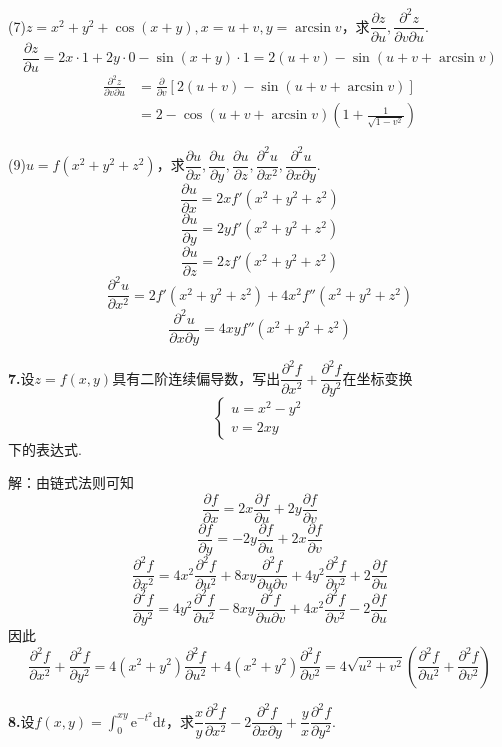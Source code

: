 \documentclass[12pt, a4paper]{article}
\newcommand{\e}{\mathrm{e}}
\newcommand{\dif}{\mathrm{d}}
\begin{document}
(7)\(z = x^2 + y^2 + \cos(x + y), x = u + v, y = \arcsin v\)，求\(\dfrac{\partial z}{\partial u}, \dfrac{\partial^2 z}{\partial v \partial u}\).
\[\frac{\partial z}{\partial u} = 2x \cdot 1 + 2y \cdot 0 - \sin(x + y) \cdot 1 = 2(u + v) - \sin(u + v + \arcsin v)\]
\begin{align*}
\frac{\partial^2 z}{\partial v \partial u} &= \frac{\partial}{\partial v}\left[2(u + v) - \sin(u + v + \arcsin v)\right] \\
&= 2 - \cos(u + v + \arcsin v) \left(1 + \frac{1}{\sqrt{1 - v^2}}\right)
\end{align*}

(9)\(u = f(x^2 + y^2 + z^2)\)，求\(\dfrac{\partial u}{\partial x}, \dfrac{\partial u}{\partial y}, \dfrac{\partial u}{\partial z}, \dfrac{\partial^2 u}{\partial x^2}, \dfrac{\partial^2 u}{\partial x \partial y}\).
\[\frac{\partial u}{\partial x} = 2x f'(x^2 + y^2 + z^2)\]
\[\frac{\partial u}{\partial y} = 2y f'(x^2 + y^2 + z^2)\]
\[\frac{\partial u}{\partial z} = 2z f'(x^2 + y^2 + z^2)\]
\[\frac{\partial^2 u}{\partial x^2} = 2f'(x^2 + y^2 + z^2) + 4x^2 f''(x^2 + y^2 + z^2)\]
\[\frac{\partial^2 u}{\partial x \partial y} = 4xy f''(x^2 + y^2 + z^2)\]

\textbf{7.}设\(z = f(x, y)\)具有二阶连续偏导数，写出\(\dfrac{\partial^2 f}{\partial x^2} + \dfrac{\partial^2 f}{\partial y^2}\)在坐标变换
\[\begin{cases}
u = x^2 - y^2 \\
v = 2xy
\end{cases}\]
下的表达式.

解：由链式法则可知
\[\frac{\partial f}{\partial x} = 2x\frac{\partial f}{\partial u} + 2y\frac{\partial f}{\partial v}\]
\[\frac{\partial f}{\partial y} = -2y\frac{\partial f}{\partial u} + 2x\frac{\partial f}{\partial v}\]
\[\frac{\partial^2 f}{\partial x^2} = 4x^2 \frac{\partial^2 f}{\partial u^2} + 8xy \frac{\partial^2 f}{\partial u \partial v} + 4y^2 \frac{\partial^2 f}{\partial v^2} + 2\frac{\partial f}{\partial u}\]
\[\frac{\partial^2 f}{\partial y^2} = 4y^2 \frac{\partial^2 f}{\partial u^2} - 8xy \frac{\partial^2 f}{\partial u \partial v} + 4x^2 \frac{\partial^2 f}{\partial v^2} - 2\frac{\partial f}{\partial u}\]
因此
\[\frac{\partial^2 f}{\partial x^2} + \frac{\partial^2 f}{\partial y^2} = 4(x^2 + y^2) \frac{\partial^2 f}{\partial u^2} + 4(x^2 + y^2) \frac{\partial^2 f}{\partial v^2} = 4\sqrt{u^2 + v^2}(\frac{\partial^2 f}{\partial u^2} + \frac{\partial^2 f}{\partial v^2})\]

\textbf{8.}设\(f(x, y) = \int_{0}^{xy} \e^{-t^2} \dif t\)，求\(\dfrac{x}{y} \dfrac{\partial^2 f}{\partial x^2} - 2\dfrac{\partial^2 f}{\partial x \partial y} + \dfrac{y}{x} \dfrac{\partial^2 f}{\partial y^2}\).
\end{document}
